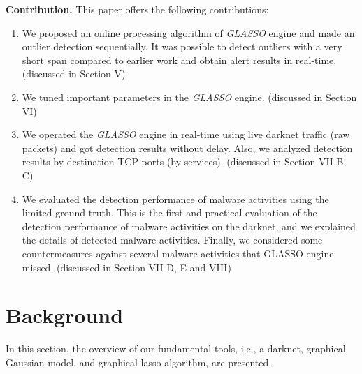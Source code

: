 \documentclass[conference]{IEEEtran}
\begin{document}
\noindent
\textbf{Contribution.}\space\space
This paper offers the following contributions:
\begin{enumerate}
	\item We proposed an online processing algorithm of {\it GLASSO} engine and made an outlier detection sequentially.
  It was possible to detect outliers with a very short span compared to earlier work and obtain alert results in real-time. (discussed in Section V)
	\item We tuned important parameters in the {\it GLASSO} engine. (discussed in Section V\hspace{-.1em}I)
	\item We operated the {\it GLASSO} engine in real-time using live darknet traffic (raw packets) and got detection results without delay.
  Also, we analyzed detection results by destination TCP ports (by services). (discussed in Section V\hspace{-.1em}I\hspace{-.1em}I-B, C)
  \item We evaluated the detection performance of malware activities using the limited ground truth.
  This is the first and practical evaluation of the detection performance of malware activities on the darknet, and we explained the details of detected malware activities.
  Finally, we considered some countermeasures against several malware activities that GLASSO engine missed. (discussed in Section V\hspace{-.1em}I\hspace{-.1em}I-D, E and V\hspace{-.1em}I\hspace{-.1em}I\hspace{-.1em}I)
\end{enumerate}



\section{Background}
In this section, the overview of our fundamental tools, i.e., a darknet, graphical Gaussian model, and graphical lasso algorithm, are presented.
\end{document}
